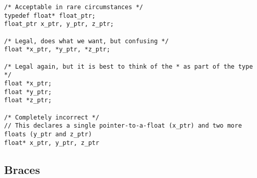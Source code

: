 \begin{itemize}
\begin{verbatim}
/* Acceptable in rare circumstances */
typedef float* float_ptr;
float_ptr x_ptr, y_ptr, z_ptr;

/* Legal, does what we want, but confusing */
float *x_ptr, *y_ptr, *z_ptr;

/* Legal again, but it is best to think of the * as part of the type */
float *x_ptr;
float *y_ptr;
float *z_ptr;

/* Completely incorrect */
// This declares a single pointer-to-a-float (x_ptr) and two more floats (y_ptr and z_ptr)
float* x_ptr, y_ptr, z_ptr
        \end{verbatim}
\end{itemize}

\subsection{Braces}

